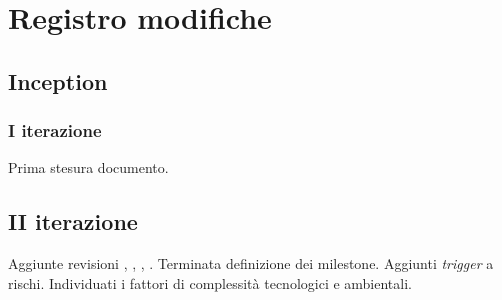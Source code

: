 \documentclass[10pt]{softeng}
\begin{document}
\startofdocument

\clearpage





\clearpage



\clearpage



\clearpage



\clearpage

\section{Registro modifiche}

\subsection{Inception}

\subsubsection{I iterazione}

Prima stesura documento.

\subsection{II iterazione}

Aggiunte revisioni , , , .
Terminata definizione dei milestone.
Aggiunti \emph{trigger} a rischi.
Individuati i fattori di complessit\`a tecnologici e ambientali.
\end{document}
